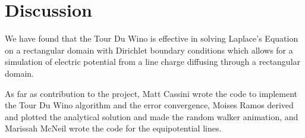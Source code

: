 \documentclass{amsart}
\begin{document}
\section{Discussion}
We have found that the Tour Du Wino is effective in solving Laplace's Equation on a rectangular domain with Dirichlet boundary conditions which allows for a simulation of electric potential from a line charge diffusing through a rectangular domain.

As far as contribution to the project, Matt Cassini wrote the code to implement the Tour Du Wino algorithm and the error convergence, Moises Ramos derived and plotted the analytical solution and made the random walker animation, and Marissah McNeil wrote the code for the equipotential lines.



\end{document}
